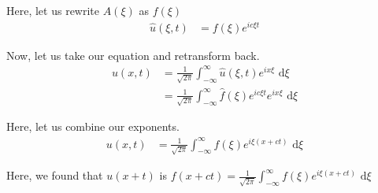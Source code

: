 Here, let us rewrite $A(\xi)$ as $f(\xi)$
%
\begin{align}
  \hat u(\xi, t) & = f(\xi) e^{i c \xi t}
\end{align}

Now, let us take our equation and retransform back.
%
\begin{align}
  u(x, t) & = \frac{1}{\sqrt{2 \pi}} \int^\infty_{-\infty} \hat u(\xi, t) e^{i x \xi} \text{ d}\xi\\
  & = \frac{1}{\sqrt{2 \pi}} \int^\infty_{-\infty} \hat f(\xi) e^{i c \xi t} e^{i x \xi} \text{ d}\xi
\end{align}

Here, let us combine our exponents.
%
\begin{align}
  u(x, t) & = \frac{1}{\sqrt{2 \pi}} \int^\infty_{-\infty} f(\xi) e^{i \xi(x + ct)} \text{ d}\xi
\end{align}

Here, we found that $u(x + t)$ is $f(x + ct) = \frac{1}{\sqrt{2 \pi}} \int^\infty_{-\infty} f(\xi) e^{i \xi(x + ct)} \text{ d}\xi$

